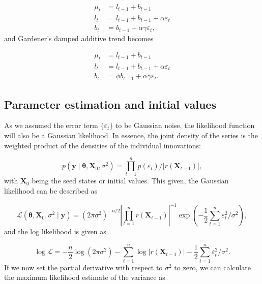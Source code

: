 \begin{equation}
	\begin{array}{rl}
		\mu_{t}&=l_{t-1}+b_{t-1} \\
		l_{t}&=l_{t-1}+b_{t-1}+\alpha \varepsilon_{t} \\
		b_{t}&=b_{t-1}+\alpha \gamma \varepsilon_{t},
	\end{array}
\end{equation}
%
and Gardener's damped additive trend becomes

\begin{equation}
	\begin{array}{rl}
		\mu_{t}&=l_{t-1}+b_{t-1} \\
		l_{t}&=l_{t-1}+b_{t-1}+\alpha \varepsilon_{t} \\
		b_{t}&=\phi b_{t-1}+\alpha \gamma \varepsilon_{t}.
	\end{array}
\end{equation}
%

\subsection{Parameter estimation and initial values}

As we assumed the error term $\{\varepsilon_t\}$ to be Gaussian noise, the likelihood function will also be a Gaussian likelihood. In essence, the joint
density of the series is the weighted product of the densities of the individual innovations:

\begin{equation}
	p\left(\boldsymbol{y} \mid \boldsymbol{\theta}, \boldsymbol{X}_{0}, \sigma^{2}\right)=\prod_{t=1}^{n} p\left(\varepsilon_{t}\right) /\left|r\left(\boldsymbol{X}_{t-1}\right)\right|,
\end{equation}
%
with $\boldsymbol{X}_0$ being the seed states or initial values. This given, the Gaussian likelihood can be described as

\begin{equation}
\label{expsm-likeli}
	\mathcal{L}\left(\boldsymbol{\theta}, \boldsymbol{X}_{0}, \sigma^{2} \mid \boldsymbol{y}\right)=\left(2 \pi \sigma^{2}\right)^{-n / 2}\left|\prod_{t=1}^{n} r\left(\boldsymbol{X}_{t-1}\right)\right|^{-1} \exp \left(-\frac{1}{2} \sum_{t=1}^{n} \varepsilon_{t}^{2} / \sigma^{2}\right),
\end{equation}
%
and the log likelihood is given as 

\begin{equation}
	\log \mathcal{L}=-\frac{n}{2} \log \left(2 \pi \sigma^{2}\right)-\sum_{t=1}^{n} \log \left|r\left(\boldsymbol{X}_{t-1}\right)\right|-\frac{1}{2} \sum_{t=1}^{n} \varepsilon_{t}^{2} / \sigma^{2}.
\end{equation}
%
If we now set the partial derivative with respect to $\sigma^2$ to zero, we can calculate the maximum likelihood estimate of the variance as

